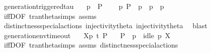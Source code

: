 \begin{isabellebody}
\isadelimproof
\isanewline
%
\endisadelimproof
\isanewline
{}\isamarkupfalse%
\ generation{\isacharunderscore}{\kern0pt}triggered{\isacharunderscore}{\kern0pt}tau{\isacharcolon}{\kern0pt}\isanewline
\ \ \ {\isacartoucheopen}{\isasymtheta}{\isacharparenleft}{\kern0pt}p{\isacharparenright}{\kern0pt}\ {\isasymlongmapsto}\isactrlsup {\isasymtheta}{\isasymtau}\ P{\isacharprime}{\kern0pt}{\isacartoucheclose}\isanewline
\ \ \ {\isacartoucheopen}{\isasymexists}\ p{\isacharprime}{\kern0pt}{\isachardot}{\kern0pt}\ P{\isacharprime}{\kern0pt}\ {\isacharequal}{\kern0pt}\ {\isasymtheta}{\isacharparenleft}{\kern0pt}p{\isacharprime}{\kern0pt}{\isacharparenright}{\kern0pt}\ {\isasymand}\ p\ {\isasymlongmapsto}{\isasymtau}\ p{\isacharprime}{\kern0pt}{\isacartoucheclose}\isanewline
%
\isadelimproof
\ \ %
\endisadelimproof
%
\isatagproof
{}\isamarkupfalse%
\ iffD{}{\isacharbrackleft}{\kern0pt}OF\ tran{\isacharunderscore}{\kern0pt}theta{\isachardot}{\kern0pt}simps\ assms{\isacharbrackright}{\kern0pt}\isanewline
\ \ \isamarkupfalse%
\ distinctness{\isacharunderscore}{\kern0pt}special{\isacharunderscore}{\kern0pt}actions{\isacharparenleft}{\kern0pt}{}{\isacharparenright}{\kern0pt}\ injectivity{\isacharunderscore}{\kern0pt}theta{\isacharparenleft}{\kern0pt}{}{\isacharparenright}{\kern0pt}\ injectivity{\isacharunderscore}{\kern0pt}theta{\isacharparenleft}{\kern0pt}{}{\isacharparenright}{\kern0pt}\ \isamarkupfalse%
\ blast%
\endisatagproof
{\isafoldproof}%
%
\isadelimproof
\isanewline
%
\endisadelimproof
\ \ \isanewline
{}\isamarkupfalse%
\ generation{\isacharunderscore}{\kern0pt}env{\isacharunderscore}{\kern0pt}timeout{\isacharcolon}{\kern0pt}\isanewline
\ \ \ {\isacartoucheopen}{\isasymtheta}{\isacharbrackleft}{\kern0pt}X{\isacharbrackright}{\kern0pt}{\isacharparenleft}{\kern0pt}p{\isacharparenright}{\kern0pt}\ {\isasymlongmapsto}\isactrlsup {\isasymtheta}t{\isacharunderscore}{\kern0pt}{\isasymepsilon}\ P{\isacharprime}{\kern0pt}{\isacartoucheclose}\isanewline
\ \ \ {\isacartoucheopen}P{\isacharprime}{\kern0pt}\ {\isacharequal}{\kern0pt}\ {\isasymtheta}{\isacharparenleft}{\kern0pt}p{\isacharparenright}{\kern0pt}\ {\isasymand}\ idle\ p\ X{\isacartoucheclose}\isanewline
%
\isadelimproof
\ \ %
\endisadelimproof
%
\isatagproof
{}\isamarkupfalse%
\ iffD{}{\isacharbrackleft}{\kern0pt}OF\ tran{\isacharunderscore}{\kern0pt}theta{\isachardot}{\kern0pt}simps\ assms{\isacharbrackright}{\kern0pt}\ distinctness{\isacharunderscore}{\kern0pt}special{\isacharunderscore}{\kern0pt}actions\isanewline

\end{isabellebody}
